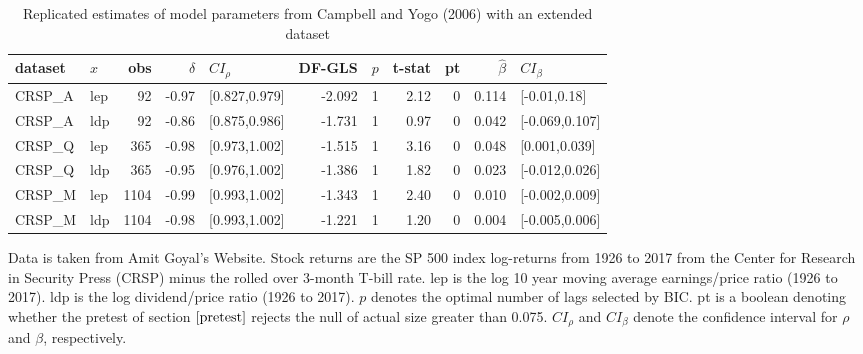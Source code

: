 \documentclass{article}
\begin{document}
\begin{table}[ht]
\centering
\caption{Replicated estimates of model parameters from Campbell and Yogo (2006) with an extended dataset}
\label{tab:extended}
\begin{threeparttable}
\begin{tabular}{llrrlrrrrrl}
  \hline
dataset & $x$ & obs & $\hat{\delta}$ & $CI_{\rho}$ & DF-GLS & $p$ &t-stat & pt & $\hat{\beta}$ & $CI_{\beta}$ \\ 
  \hline
    CRSP\_A  & lep & 92 & -0.97 & [0.827,0.979] & -2.092 & 1 & 2.12 & 0 & 0.114 & [-0.01,0.18] \\ 
    CRSP\_A  & ldp & 92 & -0.86 & [0.875,0.986] & -1.731 & 1 & 0.97 & 0 & 0.042 & [-0.069,0.107] \\ 
   CRSP\_Q & lep & 365 & -0.98 & [0.973,1.002] & -1.515 & 1 & 3.16 & 0 & 0.048 & [0.001,0.039] \\ 
  CRSP\_Q & ldp & 365 & -0.95 & [0.976,1.002] & -1.386 & 1 & 1.82 & 0 & 0.023 & [-0.012,0.026] \\ 
  CRSP\_M & lep & 1104 & -0.99 & [0.993,1.002] & -1.343 & 1 & 2.40 & 0 & 0.010 & [-0.002,0.009] \\ 
  CRSP\_M & ldp & 1104 & -0.98 & [0.993,1.002] & -1.221 & 1 & 1.20 & 0 & 0.004 & [-0.005,0.006] \\ 
\hline
\end{tabular}
 \begin{tablenotes}
 \small
\item Data is taken from Amit Goyal’s Website. Stock returns are the SP 500 index log-returns from 1926 to 2017 from the Center for Research in Security Press (CRSP) minus the rolled over 3-month T-bill rate. lep is the log 10 year moving average earnings/price ratio (1926 to 2017). ldp is the log dividend/price ratio (1926 to 2017).
$p$ denotes the optimal number of lags selected by BIC. pt is a boolean denoting whether the pretest of section $\ref{pretest}$ rejects the null of actual size greater than 0.075. $CI_{\rho}$ and $CI_{\beta}$ denote the confidence interval for $\rho$ and $\beta$, respectively.
\end{tablenotes}
\end{threeparttable}
\end{table}
\end{document}
